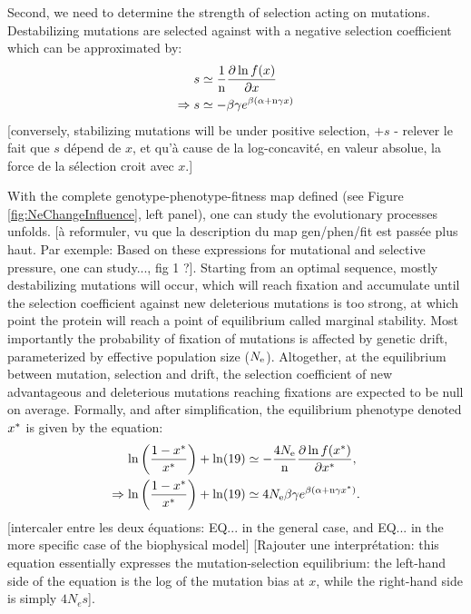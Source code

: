 \documentclass{article}
\begin{document}
	
	Second, we need to determine the strength of selection acting on mutations. Destabilizing mutations are selected against with a negative selection coefficient which can be approximated by:
	\begin{align}
	s & \simeq \frac{1}{\text{n}}\frac{ \partial \ln f(x) }{\partial x} \label{eq:s} \\
	\Rightarrow s & \simeq - \beta \gamma e^{\beta (\alpha + \text{n} \gamma x)} \label{eq:s-unfolded}
	\end{align}
	[conversely, stabilizing mutations will be under positive selection, $+s$ - relever le fait que $s$ dépend de $x$, et qu'à cause de la log-concavité, en valeur absolue, la force de la sélection croit avec $x$.]
	
	With the complete genotype-phenotype-fitness map defined (see Figure \ref{fig:NeChangeInfluence}, left panel), one can study the evolutionary processes unfolds. [à reformuler, vu que la description du map gen/phen/fit est passée plus haut. Par exemple: Based on these expressions for mutational and selective pressure, one can study..., fig 1 ?].
	Starting from an optimal sequence, mostly destabilizing mutations will occur, which will reach fixation and accumulate until the selection coefficient against new deleterious mutations is too strong, at which point the protein will reach a point of equilibrium called marginal stability.
	Most importantly the probability of fixation of mutations is affected by genetic drift, parameterized by effective population size ($N_{\mathrm{e}}$).
	Altogether, at the equilibrium between mutation, selection and drift, the selection coefficient of new advantageous and deleterious mutations reaching fixations are expected to be null on average.
	Formally, and after simplification, the equilibrium phenotype denoted $x^{*}$ is given by the equation:
	\begin{align}
	\ln \left( \frac{1 - x^{*}}{x^{*}} \right) + \ln (19) & \simeq - \frac{4N_{\mathrm{e}}}{\text{n}} \frac{ \partial \ln f(x^{*}) }{\partial {x^{*}}}, \\
	\Rightarrow \ln \left( \frac{1 - x^{*}}{x^{*}} \right) + \ln (19)  & \simeq 4N_{\mathrm{e}} \beta \gamma e^{\beta (\alpha + \text{n} \gamma x^{*})}. \label{eq:equilibrium}
	\end{align}
	[intercaler entre les deux équations: EQ... in the general case, and EQ... in the more specific case of the biophysical model]
	[Rajouter une interprétation: this equation essentially expresses the mutation-selection equilibrium: the left-hand side of the equation is the log of the mutation bias at $x$, while the right-hand side is simply $4 N_e s$].
	
\end{document}

